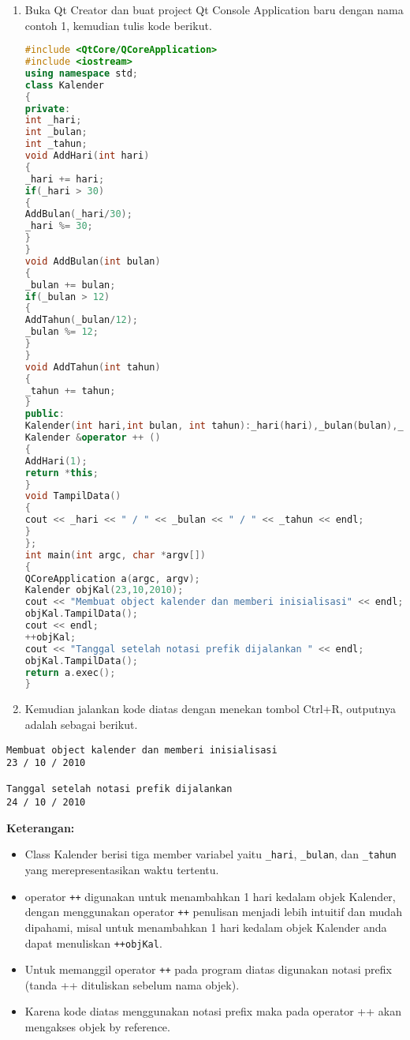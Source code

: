 \begin{enumerate}
\def\labelenumi{\arabic{enumi}.}
\item
  Buka Qt Creator dan buat project Qt Console Application baru dengan
  nama contoh 1, kemudian tulis kode berikut.

\begin{lstlisting}[language=c++]
#include <QtCore/QCoreApplication>
#include <iostream>
using namespace std;
class Kalender
{
private:
int _hari;
int _bulan;
int _tahun;
void AddHari(int hari)
{
_hari += hari;
if(_hari > 30)
{
AddBulan(_hari/30);
_hari %= 30;
}
}
void AddBulan(int bulan)
{
_bulan += bulan;
if(_bulan > 12)
{
AddTahun(_bulan/12);
_bulan %= 12;
}
}
void AddTahun(int tahun)
{
_tahun += tahun;
}
public:
Kalender(int hari,int bulan, int tahun):_hari(hari),_bulan(bulan),_tahun(tahun){ }
Kalender &operator ++ ()
{
AddHari(1);
return *this;
}
void TampilData()
{
cout << _hari << " / " << _bulan << " / " << _tahun << endl;
}
};
int main(int argc, char *argv[])
{
QCoreApplication a(argc, argv);
Kalender objKal(23,10,2010);
cout << "Membuat object kalender dan memberi inisialisasi" << endl;
objKal.TampilData();
cout << endl;
++objKal;
cout << "Tanggal setelah notasi prefik dijalankan " << endl;
objKal.TampilData();
return a.exec();
}
\end{lstlisting}
\item
  Kemudian jalankan kode diatas dengan menekan tombol Ctrl+R, outputnya
  adalah sebagai berikut.
\end{enumerate}

\begin{verbatim}
Membuat object kalender dan memberi inisialisasi
23 / 10 / 2010

Tanggal setelah notasi prefik dijalankan
24 / 10 / 2010
\end{verbatim}

\textbf{Keterangan:}

\begin{itemize}
\tightlist
\item
  Class Kalender berisi tiga member variabel yaitu \texttt{\_hari},
  \texttt{\_bulan}, dan \texttt{\_tahun} yang merepresentasikan waktu
  tertentu.
\item
  operator \texttt{++} digunakan untuk menambahkan 1 hari kedalam objek
  Kalender, dengan menggunakan operator \texttt{++} penulisan menjadi
  lebih intuitif dan mudah dipahami, misal untuk menambahkan 1 hari
  kedalam objek Kalender anda dapat menuliskan \texttt{++objKal}.
\item
  Untuk memanggil operator \texttt{++} pada program diatas digunakan
  notasi prefix (tanda ++ dituliskan sebelum nama objek).
\item
  Karena kode diatas menggunakan notasi prefix maka pada operator ++
  akan mengakses objek by reference.
\end{itemize}

